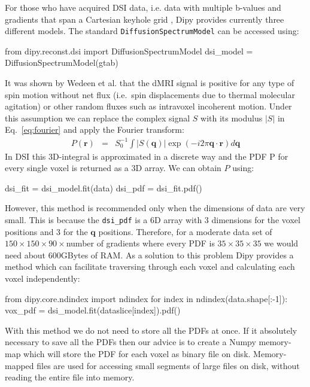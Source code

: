 \documentclass{bioinfo}
\begin{document}
For those who have acquired DSI data, i.e. data with multiple b-values
and gradients that span a Cartesian keyhole grid \citep{tuch:02,
  wedeen-hagmann-etal:05, Garyfallidis_thesis}, Dipy provides currently three
different models. The standard \texttt{DiffusionSpectrumModel} can be
accessed using:
\begin{python}
from dipy.reconst.dsi import DiffusionSpectrumModel
dsi_model = DiffusionSpectrumModel(gtab)
\end{python}
It was shown by Wedeen et al. \citep{wedeen-hagmann-etal:05} that the dMRI
signal is positive for any type of spin motion without net flux (i.e.~spin
displacements due to thermal molecular agitation) or other random fluxes such
as intravoxel incoherent motion. Under this assumption we can replace the
complex signal $S$ with its modulus $|S|$ in Eq.~\ref{eq:fourier} and apply the
Fourier transform:
\begin{eqnarray}
P(\mathbf{r}) & = &
S_{0}^{-1}\int|S(\mathbf{q})|\exp(-i2\pi\mathbf{q}\cdot\mathbf{r})d\mathbf{q}\label{eq:P_modulus}
\end{eqnarray}
In DSI this 3D-integral is approximated in a discrete way and the
PDF P for every single voxel is returned as a 3D array. We can obtain
$P$ using:
\begin{python}
dsi_fit = dsi_model.fit(data)
dsi_pdf = dsi_fit.pdf()
\end{python}
However, this method is recommended only when the dimensions of data are very
small. This is because the \texttt{dsi\_pdf} is a 6D array with 3 dimensions
for the voxel positions and 3 for the $\mathbf{q}$ positions. Therefore, for a
moderate data set of $150\times150\times90\times$number of gradients where every PDF is
$35\times35\times35$ we would need about 600GBytes of RAM. As a solution to
this problem Dipy provides a method which can facilitate traversing through
each voxel and calculating each voxel independently:
\begin{python}
from dipy.core.ndindex import ndindex
for index in ndindex(data.shape[:-1]):
    vox_pdf = dsi_model.fit(dataslice[index]).pdf()
\end{python}
With this method we do not need to store all the PDFs at once. If it absolutely
necessary to save all the PDFs then our advice is to create a Numpy memory-map
which will store the PDF for each voxel as binary file on disk. Memory-mapped
files are used for accessing small segments of large files on disk, without
reading the entire file into memory.
\end{document}
